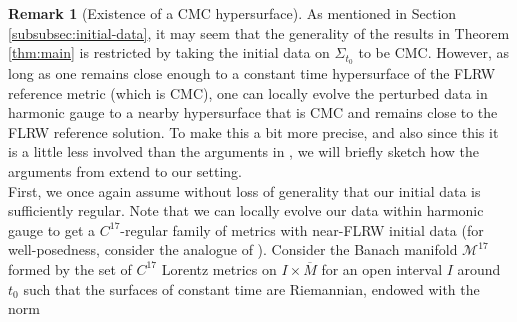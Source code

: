 \documentclass[11pt,leqno,textwidth=10cm]{amsart}
\numberwithin{equation}{section}
\theoremstyle{definition}
\newtheorem{remark}[definition]{Remark}
\theoremstyle{plain}
\newcommand{\1}{\mathbbm{1}}
\newcommand{\g}{\overline{g}}
\newcommand{\M}{\overline{M}}
\newcommand{\change}[1]{\color{black}#1\color{black}}
\begin{document}
\begin{remark}[Existence of a CMC hypersurface]\label{rem:CMC-hypersurface}
As mentioned in \change{Section \ref{subsubsec:initial-data}}, it may seem that the generality of the results in Theorem \ref{thm:main} is restricted by taking the initial data on $\Sigma_{t_0}$ to be CMC. %
However, as long as one remains close enough to a constant time hypersurface of the FLRW reference metric (which is CMC), one can locally evolve the perturbed data in harmonic gauge to a nearby hypersurface that is CMC and remains close to the FLRW reference solution. %
\change{To make this a bit more precise, and also since this it is a little less involved than the arguments in \cite{Rodnianski2014}, we will briefly sketch how the arguments from \cite[Section 2.5]{FajKr20} extend to our setting. \\%
First, we once again assume without loss of generality that our initial data is sufficiently regular. Note that we can locally evolve our data within harmonic gauge to get a $C^{17}$-regular family of metrics with near-FLRW initial data (for well-posedness, consider the analogue of \cite[Proposition 14.1]{Rodnianski2014}). Consider the Banach manifold $\mathcal{M}^{17}$ formed by the set of $C^{17}$ Lorentz metrics on $I\times\M$ for an open interval $I$ around $t_0$ such that the surfaces of constant time are Riemannian, endowed with the norm
}
\end{remark}
\end{document}
